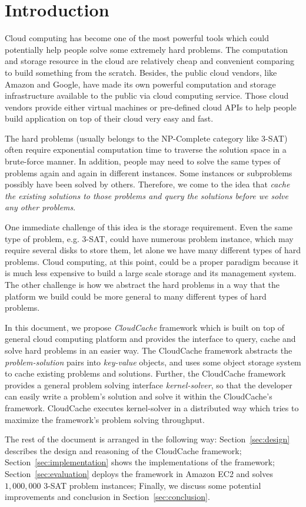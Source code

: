 \section{Introduction}\label{sec:introduction}
Cloud computing has become one of the most powerful tools which could potentially help people solve some extremely hard problems. The computation and storage resource in the cloud are relatively cheap and convenient comparing to build something from the scratch. Besides, the public cloud vendors, like Amazon and Google, have made its own powerful computation and storage infrastructure available to the public via cloud computing service. Those cloud vendors provide either virtual machines or pre-defined cloud APIs to help people build application on top of their cloud very easy and fast.

The hard problems (usually belongs to the NP-Complete category like 3-SAT) often require exponential computation time to traverse the solution space in a brute-force manner. In addition, people may need to solve the same types of problems again and again in different instances. Some instances or subproblems possibly have been solved by others. Therefore, we come to the idea that \emph{cache the existing solutions to those problems and query the solutions before we solve any other problems}. 

One immediate challenge of this idea is the storage requirement. Even the same type of problem, e.g. 3-SAT, could have numerous problem instance, which may require several disks to store them, let alone we have many different types of hard problems. Cloud computing, at this point, could be a proper paradigm because it is much less expensive to build a large scale storage and its management system. The other challenge is how we abstract the hard problems in a way that the platform we build could be more general to many different types of hard problems.

In this document, we propose \emph{CloudCache} framework which is built on top of general cloud computing platform and provides the interface to query, cache and solve hard problems in an easier way. The CloudCache framework abstracts the \emph{problem-solution} pairs into \emph{key-value} objects, and uses some object storage system to cache existing problems and solutions. Further, the CloudCache framework provides a general problem solving interface \emph{kernel-solver}, so that the developer can easily write a problem's solution and solve it within the CloudCache's framework. CloudCache executes kernel-solver in a distributed way which tries to maximize the framework's problem solving throughput.

The rest of the document is arranged in the following way: Section~\ref{sec:design} describes the design and reasoning of the CloudCache framework; Section~\ref{sec:implementation} shows the implementations of the framework; Section~\ref{sec:evaluation} deploys the framework in Amazon EC2 and solves $1,000,000$ 3-SAT problem instances; Finally, we discuss some potential improvements and conclusion in Section~\ref{sec:conclusion}.
